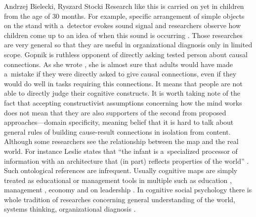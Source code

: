 \begin{artengenv2auth}{Andrzej Bielecki, Ryszard Stocki}
Research like this is carried on yet in children from the age of 30 months. For example, specific arrangement of simple objects on the stand with a~detector evokes sound signal and researchers observe how children come up to an idea of when this sound is occurring 
\parencite[][]{gopnik_causal_2001}. %
 Those researches are very general so that they are useful in organizational diagnosis only in limited scope. Gopnik is ruthless opponent of directly asking tested person about causal connections. As she wrote 
\parencite[][]{gopnik_theory_2004}, %
 she is almost sure that adults would have made a~mistake if they were directly asked to give causal connections, even if they would do well in tasks requiring this connections. It means that people are not able to directly judge their cognitive constructs. It is worth taking note of the fact that accepting constructivist assumptions concerning how the mind works does not mean that they are also supporters of the second from proposed approaches---domain specificity, meaning belief that it is hard to talk about general rules of building cause-result connections in isolation from content. Although some researchers see the relationship between the map and the real world. For instance Leslie states that ``the infant is a~specialized processor of information with an architecture that (in part) reflects properties of the world'' 
\parencite[][]{hirschfeld_tomm_1994}%
. Such ontological references are infrequent. Usually cognitive maps are simply treated as educational or management tools in multiple such as education 
\parencites[][]{moon_applied_2011}[][]{barton_mind_2016}, %
 management 
\parencites[][]{brysson_visible_2004}[][]{lengyel_capturing_2023}, %
 economy 
\parencite[][]{voss_informal_1986} %
 and on leadership 
\parencite[][]{offermann_implicit_1994}. %
 In cognitive social psychology there is whole tradition of researches concerning general understanding of the world, systems thinking, organizational diagnosis 
\parencites[][]{bielecki_analysis_2019}[][]{bielecki_systems_2010}[][]{eden_conducting_1998}.%





\end{artengenv2auth}
